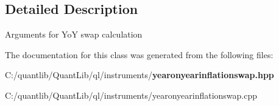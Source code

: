 \subsection{Detailed Description}
Arguments for YoY swap calculation 

The documentation for this class was generated from the following files\+:\begin{DoxyCompactItemize}
\item 
C\+:/quantlib/\+Quant\+Lib/ql/instruments/{\bf yearonyearinflationswap.\+hpp}\item 
C\+:/quantlib/\+Quant\+Lib/ql/instruments/yearonyearinflationswap.\+cpp\end{DoxyCompactItemize}
